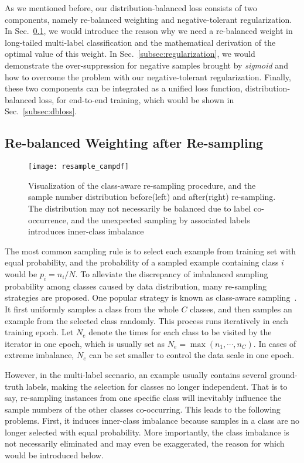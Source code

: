 \documentclass[runningheads]{llncs}
\begin{document}
As we mentioned before, our distribution-balanced loss consists of two components, namely re-balanced weighting and negative-tolerant regularization.
In Sec.~\ref{subsec:weight}, we would introduce the reason why we need a re-balanced weight in long-tailed multi-label classification
and the mathematical derivation of the optimal value of this weight.
In Sec.~\ref{subsec:regularization}, we would demonstrate the over-suppression for negative samples brought by \textit{sigmoid} and how to overcome the problem with our negative-tolerant regularization.
Finally, these two components can be integrated as a unified loss function, \ie distribution-balanced loss, for end-to-end training, which would be shown in Sec.~\ref{subsec:dbloss}.

\subsection{Re-balanced Weighting after Re-sampling} 
\label{subsec:weight}
 
\begin{figure}[t]
    \centering
    \texttt{[image: resample\_campdf]} 
    \caption{
        Visualization of the class-aware re-sampling procedure, and the sample number distribution before(left) and after(right) re-sampling. The distribution may not necessarily be balanced due to label co-occurrence, and the unexpected sampling by associated labels introduces inner-class imbalance
    }
    \label{fig:sampling}
\end{figure}

The most common sampling rule is to select each example from training set with equal probability, and the probability of a sampled example containing class $i$ would be $p_i = n_i/N$.
To alleviate the discrepancy of imbalanced sampling probability among classes caused by data distribution, many re-sampling strategies are proposed. One popular strategy is known as class-aware sampling~\cite{shen2016relay,kang2019decoupling,zhou2020BBN}. It first uniformly samples a class from the whole $C$ classes, and then samples an example from the selected class randomly. This process runs iteratively in each training epoch.
Let $N_e$ denote the times for each class to be visited by the iterator in one epoch, which is usually set as $N_e = \max(n_1, \cdots, n_C)$.
In cases of extreme imbalance, $N_e$ can be set smaller to control the data scale in one epoch.

However, in the multi-label scenario, an example usually contains several ground-truth labels, making the selection for classes no longer independent.
That is to say, re-sampling instances from one specific class will inevitably influence the sample numbers of the other classes co-occurring. This leads to the following problems.
First, it induces inner-class imbalance because samples in a class are no longer selected with equal probability.
More importantly, the class imbalance is not necessarily eliminated and may even be exaggerated, the reason for which would be introduced below.
\end{document}
